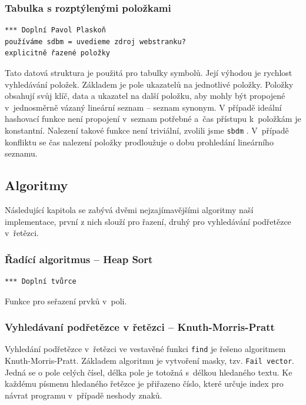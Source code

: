 \documentclass[a4paper, 12pt]{article}
\begin{document}
\subsubsection{Tabulka s rozptýlenými položkami}
\begin{verbatim}
*** Doplní Pavol Plaskoň
používáme sdbm = uvedieme zdroj webstranku?
explicitně řazené položky
\end{verbatim}
Tato datová struktura je použitá pro tabulky symbolů. Její výhodou je rychlost
vyhledávání položek. Základem je pole ukazatelů na jednotlivé položky. Položky
obsahují svůj klíč, data a ukazatel na další položku, aby mohly být propojené
v~jednosměrně vázaný lineární seznam -- seznam synonym. V případě ideální
hashovací funkce není propojení v~seznam potřebné a~čas přístupu k~položkám je
konstantní. Nalezení takové funkce není triviální, zvolili jsme \texttt{sbdm}
\cite{sbdm}.
V~případě konfliktu se čas nalezení položky prodloužuje o dobu prohledání
lineárního seznamu.

\subsection{Algoritmy}

Následující kapitola se zabývá dvěmi nejzajímavějšími algoritmy naší
implementace, první z nich slouží pro řazení, druhý pro vyhledávání
podřetězce v~řetězci.

\subsubsection{Řadící algoritmus -- Heap Sort}
\begin{verbatim}
*** Doplní tvůrce
\end{verbatim}
Funkce pro seřazení prvků v~poli.

\subsubsection{Vyhledávaní podřetězce v řetězci -- Knuth-Morris-Pratt}
Vyhledání podřetězce v~řetězci ve vestavěné funkci \texttt{find} je řešeno
algoritmem Knuth-Morris-Pratt. Základem algoritmu je vytvoření masky, tzv.
\texttt{Fail vector}. Jedná se o pole celých čísel, délka pole je totožná
s~délkou hledaného textu. Ke každému písmenu hledaného řetězce je přiřazeno
číslo, které určuje index pro návrat programu v~případě neshody znaků.
\end{document}
